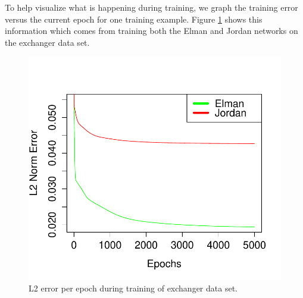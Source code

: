 \documentclass{acm_proc_article-sp}
\begin{document}
To help visualize what is happening during training, we graph the training error versus the current epoch for one training example. Figure \ref{fig:error} shows this information which comes from training both the Elman and Jordan networks on the exchanger data set. 

\begin{figure}
\begin{center}
\includegraphics[width=.5\textwidth]{Images/error.pdf}
\caption{L2 error per epoch during training of exchanger data set.}
\label{fig:error}
\end{center}
\end{figure}
\end{document}
